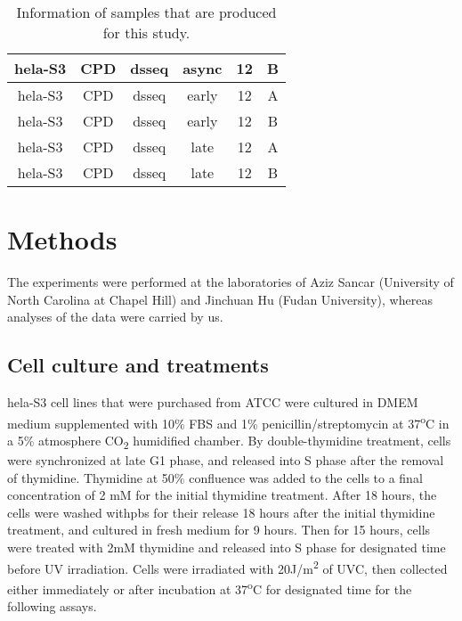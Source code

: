 \begin{table}[H]
\begin{adjustbox}{max width=\textwidth}
\begin{tabular}{cccccc}
    \gls{hela}-S3           & \gls{CPD}              & \gls{dsseq}     & async            & 12            & B                  \\ \hline 
    \gls{hela}-S3           & \gls{CPD}              & \gls{dsseq}     & early            & 12            & A                  \\ \hline 
    \gls{hela}-S3           & \gls{CPD}              & \gls{dsseq}     & early            & 12            & B                  \\ \hline 
    \gls{hela}-S3           & \gls{CPD}              & \gls{dsseq}     & late             & 12            & A                  \\ \hline 
    \gls{hela}-S3           & \gls{CPD}              & \gls{dsseq}     & late             & 12            & B \\
    \hline                
    \end{tabular}
    \end{adjustbox}
    \caption{Information of samples that are produced for this study.}
    \label{tab:samples}
    \end{table}

\section{Methods}

The experiments were performed at the laboratories of Aziz Sancar (University of North Carolina at Chapel Hill) and Jinchuan Hu (Fudan University), whereas analyses of the data were carried by us. 

\subsection{Cell culture and treatments}
\gls{hela}-S3 cell lines that were purchased from ATCC were cultured in DMEM medium supplemented with 10\% FBS and 1\% penicillin/streptomycin at 37\textsuperscript{o}C in a 5\% atmosphere CO\textsubscript{2} humidified chamber. By double-thymidine treatment, cells were synchronized at late G1 phase, and released into S phase after the removal of thymidine. Thymidine at 50\% confluence was added to the cells to a final concentration of 2 mM for the initial thymidine treatment. After 18 hours, the cells were washed with\gls{pbs} for their release 18 hours after the initial thymidine treatment, and cultured in fresh medium for 9 hours. Then for 15 hours, cells were treated with 2mM thymidine and released into S phase for designated time before UV irradiation. Cells were irradiated with 20J/m\textsuperscript{2} of UVC, then collected either immediately or after incubation at 37\textsuperscript{o}C for designated time for the following assays.

